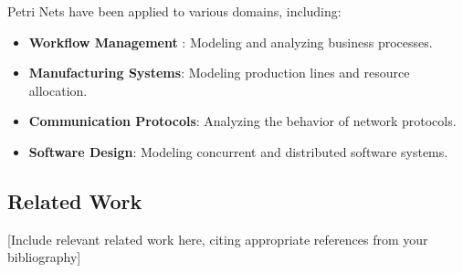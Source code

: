 Petri Nets have been applied to various domains, including:

\begin{itemize}
    \item \textbf{Workflow Management} \cite{van2000workflow}: Modeling and analyzing business processes.
    \item \textbf{Manufacturing Systems}: Modeling production lines and resource allocation.
    \item \textbf{Communication Protocols}: Analyzing the behavior of network protocols.
    \item \textbf{Software Design}: Modeling concurrent and distributed software systems.
\end{itemize}

\subsection{Related Work}

[Include relevant related work here, citing appropriate references from your bibliography]
